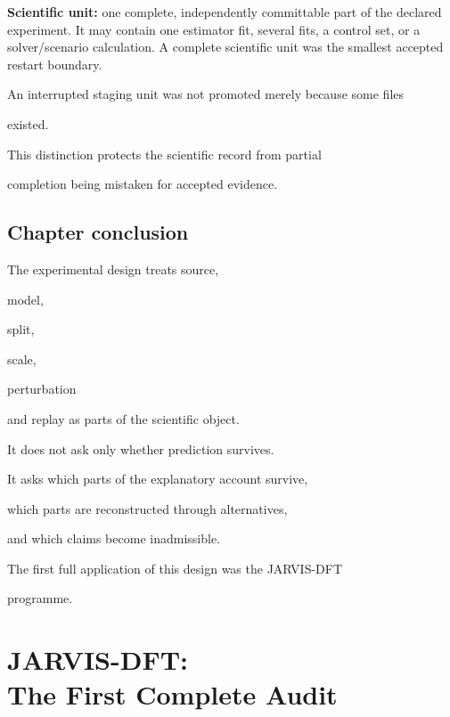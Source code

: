 \documentclass[11pt,a4paper,oneside]{report}
\begin{document}
\textbf{Scientific unit:} one complete, independently committable part of the declared experiment. It may contain one estimator fit, several fits, a control set, or a solver/scenario calculation. A complete scientific unit was the smallest accepted restart boundary.



An interrupted staging unit was not promoted merely because some files

existed.



This distinction protects the scientific record from partial

completion being mistaken for accepted evidence.





\section{Chapter conclusion}



The experimental design treats source,

model,

split,

scale,

perturbation

and replay as parts of the scientific object.



It does not ask only whether prediction survives.



It asks which parts of the explanatory account survive,

which parts are reconstructed through alternatives,

and which claims become inadmissible.



The first full application of this design was the JARVIS-DFT

programme.












\chapter[JARVIS-DFT: The First Complete Audit]{JARVIS-DFT:\\ The First Complete Audit}
\end{document}
